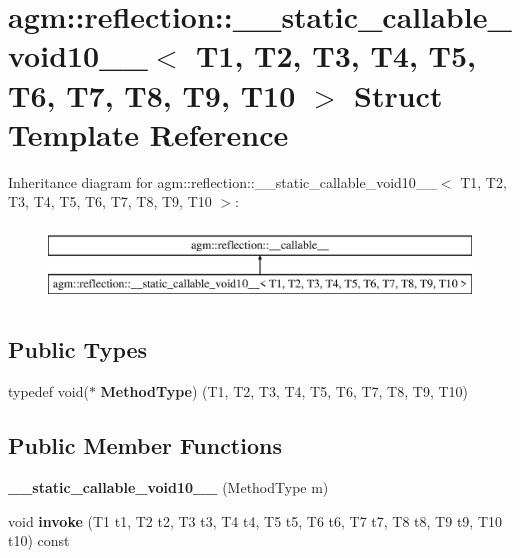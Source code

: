 \hypertarget{structagm_1_1reflection_1_1____static__callable__void10____}{}\section{agm\+:\+:reflection\+:\+:\+\_\+\+\_\+static\+\_\+callable\+\_\+void10\+\_\+\+\_\+$<$ T1, T2, T3, T4, T5, T6, T7, T8, T9, T10 $>$ Struct Template Reference}
\label{structagm_1_1reflection_1_1____static__callable__void10____}
Inheritance diagram for agm\+:\+:reflection\+:\+:\+\_\+\+\_\+static\+\_\+callable\+\_\+void10\+\_\+\+\_\+$<$ T1, T2, T3, T4, T5, T6, T7, T8, T9, T10 $>$\+:\begin{figure}[H]
\begin{center}
\leavevmode
\includegraphics[height=2.000000cm]{structagm_1_1reflection_1_1____static__callable__void10____}
\end{center}
\end{figure}
\subsection*{Public Types}
\begin{DoxyCompactItemize}
\item 
typedef void($\ast$ {\bfseries Method\+Type}) (T1, T2, T3, T4, T5, T6, T7, T8, T9, T10)\hypertarget{structagm_1_1reflection_1_1____static__callable__void10_____a04e6a218e4bcdffe84d0f455f9e7f3a8}{}\label{structagm_1_1reflection_1_1____static__callable__void10_____a04e6a218e4bcdffe84d0f455f9e7f3a8}

\end{DoxyCompactItemize}
\subsection*{Public Member Functions}
\begin{DoxyCompactItemize}
\item 
{\bfseries \+\_\+\+\_\+static\+\_\+callable\+\_\+void10\+\_\+\+\_\+} (Method\+Type m)\hypertarget{structagm_1_1reflection_1_1____static__callable__void10_____a5e4f3d52ecc5013d05706357c922167f}{}\label{structagm_1_1reflection_1_1____static__callable__void10_____a5e4f3d52ecc5013d05706357c922167f}

\item 
void {\bfseries invoke} (T1 t1, T2 t2, T3 t3, T4 t4, T5 t5, T6 t6, T7 t7, T8 t8, T9 t9, T10 t10) const \hypertarget{structagm_1_1reflection_1_1____static__callable__void10_____a401317d5e929a8fe02e6b52b38bbfd10}{}\label{structagm_1_1reflection_1_1____static__callable__void10_____a401317d5e929a8fe02e6b52b38bbfd10}

\end{DoxyCompactItemize}
